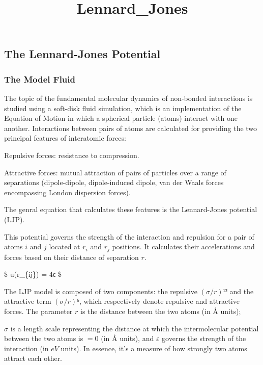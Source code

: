 \documentclass[11pt]{article}
\title{Lennard\_Jones}
\begin{document}
    
    \maketitle
    
    

    
    \hypertarget{the-lennard-jones-potential}{%
\subsection{The Lennard-Jones
Potential}\label{the-lennard-jones-potential}}

\hypertarget{the-model-fluid}{%
\subsubsection{The Model Fluid}\label{the-model-fluid}}

The topic of the fundamental molecular dynamics of non-bonded
interactions is studied using a soft-disk fluid simulation, which is an
implementation of the Equation of Motion in which a spherical particle
(atoms) interact with one another. Interactions between pairs of atoms
are calculated for providing the two principal features of interatomic
forces:

Repulsive forces: resistance to compression.

Attractive forces: mutual attraction of pairs of particles over a range
of separations (dipole-dipole, dipole-induced dipole, van der Waals
forces encompassing London dispersion forces).

The genral equation that calculates these features is the Lennard-Jones
potential (LJP).

    This potential governs the strength of the interaction and repulsion for
a pair of atoms \(i\) and \(j\) located at \(r_i\) and \(r_j\)
positions. It calculates their accelerations and forces based on their
distance of separation \(r\).

\$ u(r\_\{ij\}) = 4ϵ
\$

The LJP model is composed of two components: the repulsive \((σ/r)¹²\)
and the attractive term \((σ/r)⁶\), which respectively denote repulsive
and attractive forces. The parameter \(r\) is the distance between the
two atoms (in \(Å\) units);

\(σ\) is a length scale representing the distance at which the
intermolecular potential between the two atoms is \(= 0\) (in \(Å\)
units), and \(ε\) governs the strength of the interaction (in \(eV\)
units). In essence, it's a measure of how strongly two atoms attract
each other.
\end{document}

